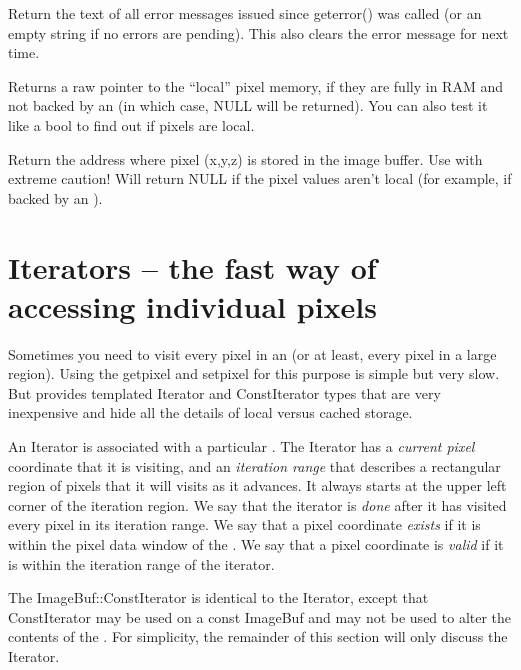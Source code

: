 Return the text of all error messages issued since {\cf geterror()} was
called (or an empty string if no errors are pending).  This also
clears the error message for next time.
\apiend

Returns a raw pointer to the ``local'' pixel memory, if they are fully
in RAM and not backed by an \ImageCache (in which case, {\cf NULL} will
be returned).  You can also test it like a {\cf bool} to find out if
pixels are local.
\apiend

Return the address where pixel (x,y,z) is stored in the image buffer.
Use with extreme caution!  Will return NULL if the pixel values
aren't local (for example, if backed by an \ImageCache).
\apiend



\section{Iterators -- the fast way of accessing individual pixels}

Sometimes you need to visit every pixel in an \ImageBuf (or at least,
every pixel in a large region).  Using the {\cf getpixel} and {\cf
  setpixel} for this purpose is simple but very slow.  But \ImageBuf
provides templated {\cf Iterator} and {\cf ConstIterator} types
that are very inexpensive and hide all the details of local versus
cached storage.

An {\cf Iterator} is associated with a particular \ImageBuf.  
The {\cf Iterator} has a \emph{current pixel} coordinate that it is
visiting, and an \emph{iteration range} that describes a rectangular
region of pixels that it will visits as it advances.  It always starts
at the upper left corner of the iteration region.  We say that
the iterator is \emph{done} after it has visited every pixel in its
iteration range.  We say that a pixel coordinate \emph{exists} if it is
within the pixel data window of the \ImageBuf.  We say that a pixel
coordinate is \emph{valid} if it is within the iteration range of the
iterator.

The {\cf ImageBuf::ConstIterator} is identical to the {\cf Iterator},
except that {\cf ConstIterator} may be used on a {\cf const ImageBuf}
and may not be used to alter the contents of the \ImageBuf.  For 
simplicity, the remainder of this section will only discuss the 
{\cf Iterator}.

